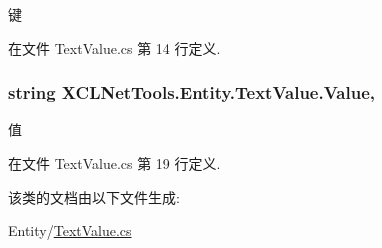键 



在文件 Text\-Value.\-cs 第 14 行定义.

\hypertarget{class_x_c_l_net_tools_1_1_entity_1_1_text_value_a8a193486b942adc898433bd29db3eff7}{
\subsubsection[{Value}]{\setlength{\rightskip}{0pt plus 5cm}string X\-C\-L\-Net\-Tools.\-Entity.\-Text\-Value.\-Value\hspace{0.3cm}{\ttfamily [get]}, {\ttfamily [set]}}}\label{class_x_c_l_net_tools_1_1_entity_1_1_text_value_a8a193486b942adc898433bd29db3eff7}


值 



在文件 Text\-Value.\-cs 第 19 行定义.



该类的文档由以下文件生成\-:\begin{DoxyCompactItemize}
\item 
Entity/\hyperlink{_text_value_8cs}{Text\-Value.\-cs}\end{DoxyCompactItemize}
